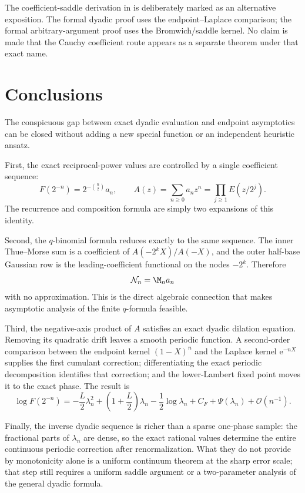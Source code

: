 \documentclass[11pt,oneside]{article}
\theoremstyle{definition}
\theoremstyle{remark}
\newcommand{\e}{\mathrm e}
\newcommand{\bigO}{\mathcal O}
\begin{document}
The coefficient-saddle derivation in  is deliberately marked as
an alternative exposition.  The formal dyadic proof uses the endpoint--Laplace comparison;
the formal arbitrary-argument proof uses the Bromwich/saddle kernel.  No claim is made that
the Cauchy coefficient route appears as a separate theorem under that exact name.

\section{Conclusions}
\label{dyadicasym:sec:conclusion}

The conspicuous gap between exact dyadic evaluation and endpoint asymptotics can be closed
without adding a new special function or an independent heuristic ansatz.

First, the exact reciprocal-power values are controlled by a single coefficient sequence:
\begin{equation*}
 F(2^{-n})=2^{-\binom n2}a_n,
 \qquad
 A(z)=\sum_{n\ge0}a_nz^n=\prod_{j\ge1}E(z/2^j).
\end{equation*}
The recurrence and composition formula are simply two expansions of this identity.

Second, the $q$-binomial formula reduces exactly to the same sequence.  The inner Thue--Morse
sum is a coefficient of $A(-2^kX)/A(-X)$, and the outer half-base Gaussian row is the
leading-coefficient functional on the nodes $-2^k$.  Therefore
\begin{equation*}
 \mathcal N_n=\M_na_n
\end{equation*}
with no approximation.  This is the direct algebraic connection that makes asymptotic
analysis of the finite $q$-formula feasible.

Third, the negative-axis product of $A$ satisfies an exact dyadic dilation equation.  Removing
its quadratic drift leaves a smooth periodic function.  A second-order comparison between the
endpoint kernel $(1-X)^n$ and the Laplace kernel $\e^{-nX}$ supplies the first cumulant
correction; differentiating the exact periodic decomposition identifies that correction; and
the lower-Lambert fixed point moves it to the exact phase.  The result is
\begin{equation*}
 \log F(2^{-n})=
 -\frac L2\lambda_n^2+
 \left(1+\frac L2\right)\lambda_n-\frac12\log\lambda_n
 +C_F+\Psi(\lambda_n)+\bigO(n^{-1}).
\end{equation*}

Finally, the inverse dyadic sequence is richer than a sparse one-phase sample: the fractional
parts of $\lambda_n$ are dense, so the exact rational values determine the entire continuous
periodic correction after renormalization.  What they do not provide by monotonicity alone is
a uniform continuum theorem at the sharp error scale; that step still requires a uniform
saddle argument or a two-parameter analysis of the general dyadic formula.
\end{document}
